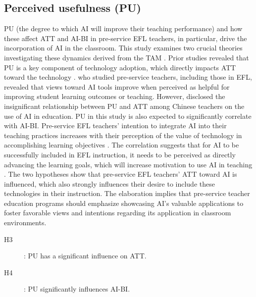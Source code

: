 \documentclass[english]{textolivre}
\begin{document}
\subsection{Perceived usefulness (PU)}\label{sec-fmt-manuscrito}
PU (the degree to which AI will improve their teaching performance) and how these affect ATT and AI-BI in pre-service EFL teachers, in particular, drive the incorporation of AI in the classroom. This study examines two crucial theories investigating these dynamics derived from the TAM \cite{davis1989tam}. Prior studies revealed that PU is a key component of technology adoption, which directly impacts ATT toward the technology \cite{gumbi2024dgb,peng2022kiosks,wang2021aiadoption,weng2018tam}. \textcite{gumbi2024dgb} who studied pre-service teachers, including those in EFL, revealed that views toward AI tools improve when perceived as helpful for improving student learning outcomes or teaching. However, \textcite{wang2021aiadoption} disclosed the insignificant relationship between PU and ATT among Chinese teachers on the use of AI in education. PU in this study is also expected to significantly correlate with AI-BI. Pre-service EFL teachers’ intention to integrate AI into their teaching practices increases with their perception of the value of technology in accomplishing learning objectives \cite{alabdullatif2023chatbots,dehghani2024chatgpt,yao2024intention,zhang2023acceptance}. The correlation suggests that for AI to be successfully included in EFL instruction, it needs to be perceived as directly advancing the learning goals, which will increase motivation to use AI in teaching \cite{yao2024intention,zhang2023acceptance}. The two hypotheses show that pre-service EFL teachers’ ATT toward AI is influenced, which also strongly influences their desire to include these technologies in their instruction. The elaboration implies that pre-service teacher education programs should emphasize showcasing AI’s valuable applications to foster favorable views and intentions regarding its application in classroom environments.

\begin{description}
    \item[H3]: PU has a significant influence on ATT.
    \item[H4]: PU significantly influences AI-BI.
\end{description}
\end{document}
